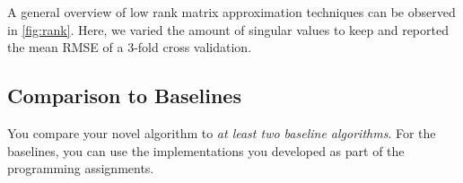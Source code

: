 \documentclass[10pt,conference,compsocconf]{IEEEtran}
\begin{document}
    A general overview of low rank matrix approximation techniques can be observed in \cref{fig:rank}.
    Here, we varied the amount of singular values to keep and reported the mean RMSE of a 3-fold cross validation.

    \subsection{Comparison to Baselines}

    You compare your novel algorithm to \emph{at least two baseline
    algorithms}. For the baselines, you can use the implementations you
    developed as part of the programming assignments.
\end{document}
